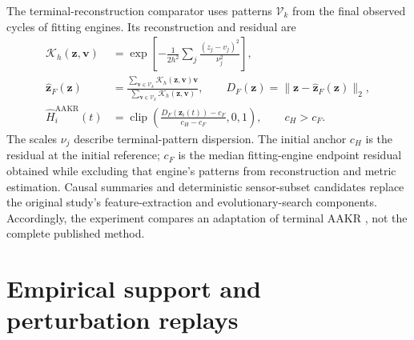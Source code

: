 \documentclass[12pt]{article}
\begin{document}
The terminal-reconstruction comparator uses patterns $\mathcal V_k$ from the final observed cycles of fitting engines. Its reconstruction and residual are
\[
\begin{aligned}
\mathcal K_h(\mathbf z,\mathbf v)
&=\exp\left[-\frac{1}{2h^2}\sum_j\frac{(z_j-v_j)^2}{\nu_j^2}\right],\\
\widehat{\mathbf z}_F(\mathbf z)
&=\frac{\sum_{\mathbf v\in\mathcal V_k}\mathcal K_h(\mathbf z,\mathbf v)\mathbf v}
{\sum_{\mathbf v\in\mathcal V_k}\mathcal K_h(\mathbf z,\mathbf v)},\qquad
D_F(\mathbf z)=\|\mathbf z-\widehat{\mathbf z}_F(\mathbf z)\|_2,\\
\widehat H_i^{\mathrm{AAKR}}(t)
&=\operatorname{clip}\left(\frac{D_F(\mathbf z_i(t))-c_F}{c_H-c_F},0,1\right),
\qquad c_H>c_F.
\end{aligned}
\]
The scales $\nu_j$ describe terminal-pattern dispersion. The initial anchor $c_H$ is the residual at the initial reference; $c_F$ is the median fitting-engine endpoint residual obtained while excluding that engine's patterns from reconstruction and metric estimation. Causal summaries and deterministic sensor-subset candidates replace the original study's feature-extraction and evolutionary-search components. Accordingly, the experiment compares an adaptation of terminal AAKR \cite{Baraldi2018HI}, not the complete published method.

\section{Empirical support and perturbation replays}
\end{document}
